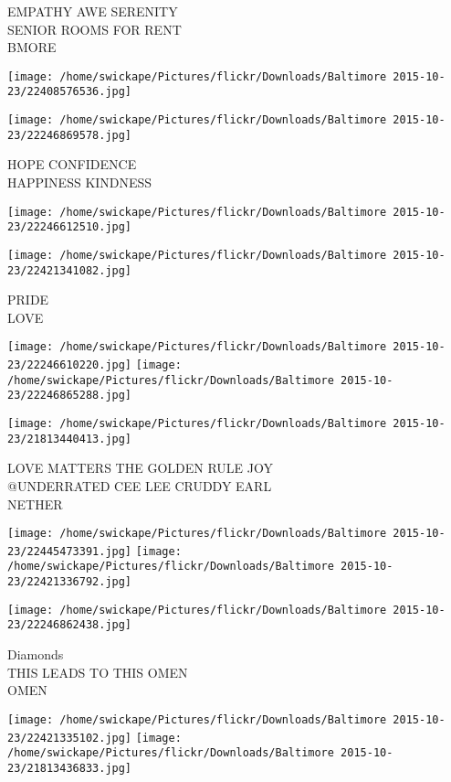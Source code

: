 \documentclass[10pt,letterpaper]{article}
\begin{document}
EMPATHY AWE SERENITY\\
SENIOR ROOMS FOR RENT\\
BMORE
\pagebreak

\texttt{[image: /home/swickape/Pictures/flickr/Downloads/Baltimore 2015-10-23/22408576536.jpg]}

\vspace{0.25in}
\texttt{[image: /home/swickape/Pictures/flickr/Downloads/Baltimore 2015-10-23/22246869578.jpg]}

HOPE CONFIDENCE\\
HAPPINESS KINDNESS
\pagebreak

\texttt{[image: /home/swickape/Pictures/flickr/Downloads/Baltimore 2015-10-23/22246612510.jpg]}

\vspace{0.25in}
\texttt{[image: /home/swickape/Pictures/flickr/Downloads/Baltimore 2015-10-23/22421341082.jpg]}

PRIDE\\
LOVE
\pagebreak

\texttt{[image: /home/swickape/Pictures/flickr/Downloads/Baltimore 2015-10-23/22246610220.jpg]}
\texttt{[image: /home/swickape/Pictures/flickr/Downloads/Baltimore 2015-10-23/22246865288.jpg]}

\vspace{0.25in}
\texttt{[image: /home/swickape/Pictures/flickr/Downloads/Baltimore 2015-10-23/21813440413.jpg]}

LOVE MATTERS THE GOLDEN RULE JOY\\
@UNDERRATED CEE LEE CRUDDY EARL\\
NETHER
\pagebreak

\texttt{[image: /home/swickape/Pictures/flickr/Downloads/Baltimore 2015-10-23/22445473391.jpg]}
\texttt{[image: /home/swickape/Pictures/flickr/Downloads/Baltimore 2015-10-23/22421336792.jpg]}

\vspace{0.25in}
\texttt{[image: /home/swickape/Pictures/flickr/Downloads/Baltimore 2015-10-23/22246862438.jpg]}

Diamonds\\
THIS LEADS TO THIS OMEN\\
OMEN
\pagebreak

\texttt{[image: /home/swickape/Pictures/flickr/Downloads/Baltimore 2015-10-23/22421335102.jpg]}
\texttt{[image: /home/swickape/Pictures/flickr/Downloads/Baltimore 2015-10-23/21813436833.jpg]}
\end{document}
